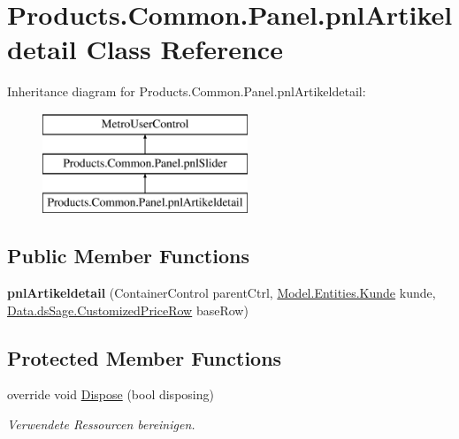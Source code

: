 \hypertarget{class_products_1_1_common_1_1_panel_1_1pnl_artikeldetail}{}\section{Products.\+Common.\+Panel.\+pnl\+Artikeldetail Class Reference}
\label{class_products_1_1_common_1_1_panel_1_1pnl_artikeldetail}
Inheritance diagram for Products.\+Common.\+Panel.\+pnl\+Artikeldetail\+:\begin{figure}[H]
\begin{center}
\leavevmode
\includegraphics[height=3.000000cm]{class_products_1_1_common_1_1_panel_1_1pnl_artikeldetail}
\end{center}
\end{figure}
\subsection*{Public Member Functions}
\begin{DoxyCompactItemize}
\item 
{\bfseries pnl\+Artikeldetail} (Container\+Control parent\+Ctrl, \hyperlink{class_products_1_1_model_1_1_entities_1_1_kunde}{Model.\+Entities.\+Kunde} kunde, \hyperlink{class_products_1_1_data_1_1ds_sage_1_1_customized_price_row}{Data.\+ds\+Sage.\+Customized\+Price\+Row} base\+Row)\hypertarget{class_products_1_1_common_1_1_panel_1_1pnl_artikeldetail_af040a42e035370bbedb78cae9b9ce0bf}{}\label{class_products_1_1_common_1_1_panel_1_1pnl_artikeldetail_af040a42e035370bbedb78cae9b9ce0bf}

\end{DoxyCompactItemize}
\subsection*{Protected Member Functions}
\begin{DoxyCompactItemize}
\item 
override void \hyperlink{class_products_1_1_common_1_1_panel_1_1pnl_artikeldetail_a05e2fc50770f8a2af3ff3d571cb826c8}{Dispose} (bool disposing)
\begin{DoxyCompactList}\small\item\em Verwendete Ressourcen bereinigen. \end{DoxyCompactList}\end{DoxyCompactItemize}
